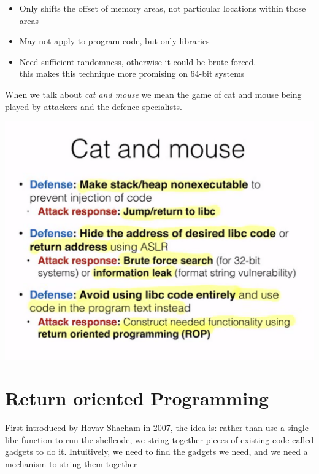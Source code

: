 \documentclass[11pt, oneside]{article}   	%
\begin{document}
\begin{itemize}
\item Only shifts the offset of memory areas, not particular locations within those areas
\item May not apply to program code, but only libraries
\item Need sufficient randomness, otherwise it could be brute forced.\\
this makes this technique more promising on 64-bit systems
\end{itemize}
When we talk about \emph{cat and mouse} we mean the game of cat and mouse being played by attackers and the defence specialists.
\begin{center}
\includegraphics[scale = 0.4]{catmouse}
\end{center}

\section*{Return oriented Programming}
First introduced by Hovav Shacham in 2007, the idea is: rather than use a single libc function to run the shellcode, we string together pieces of existing code called gadgets to do it. Intuitively, we need to find the gadgets we need, and we need a mechanism to string them together
\end{document}
